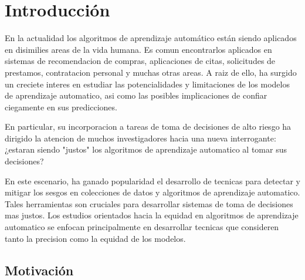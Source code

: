 \chapter*{Introducción}\label{chapter:introduction}




En la actualidad los algoritmos de aprendizaje automático están siendo aplicados en disimilies areas de la vida humana. Es comun encontrarlos aplicados en sistemas de recomendacion de compras, aplicaciones de citas, solicitudes de prestamos, contratacion personal y muchas otras areas.  A raiz de ello, ha surgido un creciete interes en estudiar las potencialidades y limitaciones de los modelos de aprendizaje automatico, asi como las posibles implicaciones de confiar ciegamente en sus predicciones.

En particular, su incorporacion a tareas de toma de decisiones de alto riesgo ha dirigido la atencion de muchos investigadores hacia una nueva interrogante: ¿estaran siendo "justos" los algoritmos de aprendizaje automatico al tomar sus decisiones?

En este escenario, ha ganado popularidad el desarrollo de tecnicas para detectar y mitigar los sesgos en colecciones de datos y algoritmos de aprendizaje automatico. Tales herramientas son cruciales para desarrollar sistemas de toma de decisiones mas justos. Los estudios orientados hacia la equidad en algoritmos de aprendizaje automatico se enfocan principalmente en desarrollar tecnicas que consideren tanto la precision como la equidad de los modelos.

\section*{Motivación}

